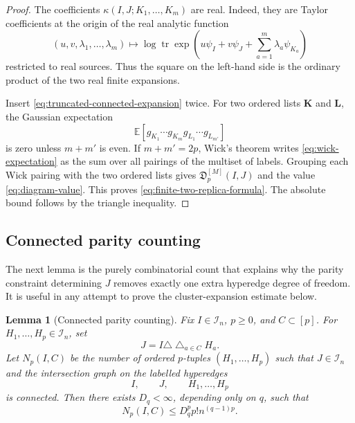 \documentclass[11pt]{article}
\newtheorem{lemma}[theorem]{Lemma}
\newcommand{\E}{\mathbb{E}}
\newcommand{\tr}{\operatorname{tr}}
\newcommand{\calI}{\mathcal{I}}
\begin{document}
\begin{proof}
  The coefficients $\kappa(I,J;K_1,\ldots,K_m)$ are real.  Indeed, they are
  Taylor coefficients at the origin of the real analytic function
  \begin{equation}\label{eq:kappa-real-valued}
    (u,v,\lambda_1,\ldots,\lambda_m)
    \mapsto
    \log\tr\exp\left(
      u\psi_I+v\psi_J+\sum_{a=1}^m\lambda_a\psi_{K_a}
    \right)
  \end{equation}
  restricted to real sources.  Thus the square on the left-hand side is the
  ordinary product of the two real finite expansions.

  Insert \eqref{eq:truncated-connected-expansion} twice.  For two ordered lists
  $\mathbf K$ and $\mathbf L$, the Gaussian expectation
  \begin{equation}\label{eq:wick-expectation}
    \E\left[g_{K_1}\cdots g_{K_m}g_{L_1}\cdots g_{L_{m'}}\right]
  \end{equation}
  is zero unless $m+m'$ is even.  If $m+m'=2p$, Wick's theorem writes
  \eqref{eq:wick-expectation} as the sum over all pairings of the multiset of
  labels.  Grouping each Wick pairing with the two ordered lists gives
  $\mathfrak D_p^{[M]}(I,J)$ and the value \eqref{eq:diagram-value}.  This
  proves \eqref{eq:finite-two-replica-formula}.  The absolute bound follows by
  the triangle inequality.

\end{proof}

\subsection{Connected parity counting}

The next lemma is the purely combinatorial count that explains why the parity
constraint determining $J$ removes exactly one extra hyperedge degree of
freedom.  It is useful in any attempt to prove the cluster-expansion estimate below.

\begin{lemma}[Connected parity counting]
  \label{lem:connected-parity-counting}
  Fix $I\in\calI_n$, $p\geq0$, and $C\subset[p]$.  For
  $H_1,\ldots,H_p\in\calI_n$, set
  \begin{equation}\label{eq:J-from-cross-pairs-counting}
    J
    =
    I\triangle\bigtriangleup_{a\in C}H_a.
  \end{equation}
  Let $N_p(I,C)$ be the number of ordered $p$-tuples
  $(H_1,\ldots,H_p)$ such that $J\in\calI_n$ and the intersection graph on the
  labelled hyperedges
  \begin{equation}\label{eq:counting-labelled-hyperedges}
    I,
    \qquad
    J,
    \qquad
    H_1,\ldots,H_p
  \end{equation}
  is connected.  Then there exists $D_q<\infty$, depending only on $q$, such
  that
  \begin{equation}\label{eq:connected-parity-counting}
    N_p(I,C)
    \leq
    D_q^p p! n^{(q-1)p}.
  \end{equation}
\end{lemma}
\end{document}
